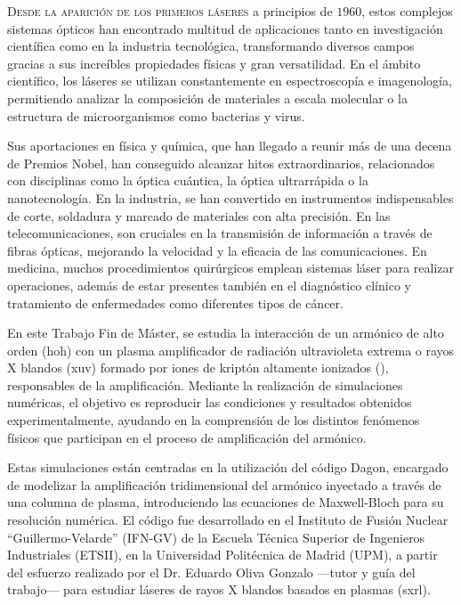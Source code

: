 \lettrine{D}{esde la aparición de los primeros láseres} a principios de $1960$, estos complejos sistemas ópticos han encontrado multitud de aplicaciones tanto en investigación científica como en la industria tecnológica, transformando diversos campos gracias a sus increíbles propiedades físicas y gran versatilidad. En el ámbito científico, los láseres se utilizan constantemente en espectroscopía e imagenología, permitiendo analizar la composición de materiales a escala molecular o la estructura de microorganismos como bacterias y virus. 

Sus aportaciones en física y química, que han llegado a reunir más de una decena de Premios Nobel, han conseguido alcanzar hitos extraordinarios, relacionados con disciplinas como la óptica cuántica, la óptica ultrarrápida o la nanotecnología. En la industria, se han convertido en instrumentos indispensables de corte, soldadura y marcado de materiales con alta precisión. En las telecomunicaciones, son cruciales en la transmisión de información a través de fibras ópticas, mejorando la velocidad y la eficacia de las comunicaciones. En medicina, muchos procedimientos quirúrgicos emplean sistemas láser para realizar operaciones, además de estar presentes también en el diagnóstico clínico y tratamiento de enfermedades como diferentes tipos de cáncer.

En este Trabajo Fin de Máster, se estudia la interacción de un armónico de alto orden (\acrshort{hoh}) con un plasma amplificador de radiación ultravioleta extrema o rayos X blandos (\acrshort{xuv}) formado por iones de kriptón altamente ionizados (), responsables de la amplificación. Mediante la realización de simulaciones numéricas, el objetivo es reproducir las condiciones y resultados obtenidos experimentalmente, ayudando en la comprensión de los distintos fenómenos físicos que participan en el proceso de amplificación del armónico.

Estas simulaciones están centradas en la utilización del código Dagon\autocite{Oliva2017}, encargado de modelizar la amplificación tridimensional del armónico inyectado a través de una columna de plasma, introduciendo las ecuaciones de Maxwell-Bloch para su resolución numérica. El código fue desarrollado en el Instituto de Fusión Nuclear \enquote{Guillermo-Velarde} (IFN-GV) de la Escuela Técnica Superior de Ingenieros Industriales (ETSII), en la Universidad Politécnica de Madrid (UPM), a partir del esfuerzo realizado por el Dr. Eduardo Oliva Gonzalo ---tutor y guía del trabajo--- para estudiar láseres de rayos X blandos basados en plasmas (\acrshort{sxrl}).

